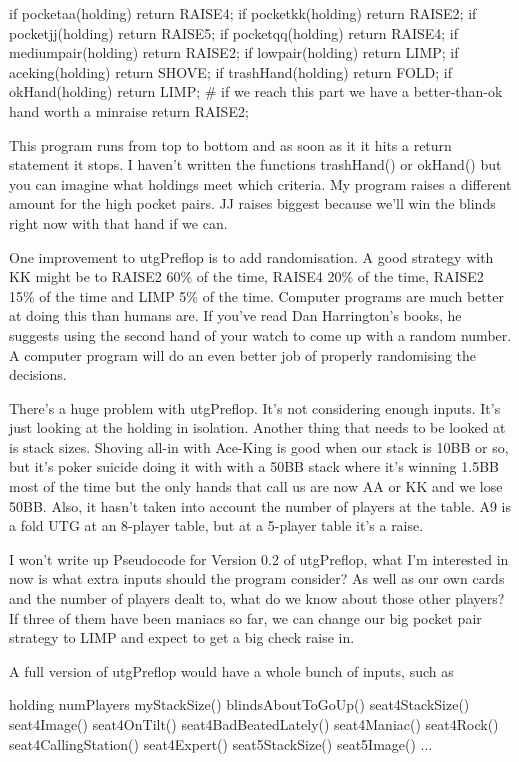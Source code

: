 if pocketaa(holding) return RAISE4;
if pocketkk(holding) return RAISE2;
if pocketjj(holding) return RAISE5;
if pocketqq(holding) return RAISE4;
if mediumpair(holding) return RAISE2;
if lowpair(holding) return LIMP;
if aceking(holding) return SHOVE;
if trashHand(holding) return FOLD;
if okHand(holding) return LIMP;
\# if we reach this part we have a better-than-ok hand worth a minraise
return RAISE2;

This program runs from top to bottom and as soon as it it hits a
return statement it stops. I haven't written the functions
trashHand() or okHand() but you can imagine what holdings
meet which criteria. My program raises a different amount
for the high pocket pairs. JJ raises biggest because we'll win the
blinds right now with that hand if we can.

One improvement to utgPreflop is to add randomisation. A good strategy
with KK might be to RAISE2 60\% of the time, RAISE4 20\% of the time,
RAISE2 15\% of the time and LIMP 5\% of the time. Computer programs
are much better at doing this than humans are. If you've read
Dan Harrington's books, he suggests using the second hand of your
watch to come up with a random number. A computer program will do an
even better job of properly randomising the decisions.

There's a huge problem with utgPreflop. It's not considering enough
inputs. It's just looking at the holding in isolation. Another thing
that needs to be looked at is stack sizes. Shoving all-in with
Ace-King is good when our stack is 10BB or so, but it's poker suicide
doing it with with a 50BB stack where it's winning 1.5BB most of the
time but the only hands that call us are now AA or KK and we lose 50BB.
Also, it hasn't taken into account the number of players at
the table. A9 is a fold UTG at an 8-player table, but at a 5-player
table it's a raise.

I won't write up Pseudocode for Version 0.2 of utgPreflop, what I'm
interested in now is what extra inputs should the program consider?
As well as our own cards and the number of players dealt to, what do
we know about those other players? If three of them have been maniacs
so far, we can change our big pocket pair strategy to LIMP and expect
to get a big check raise in.

A full version of utgPreflop would have a whole bunch of inputs, such
as

holding
numPlayers
myStackSize()
blindsAboutToGoUp()
seat4StackSize()
seat4Image()
seat4OnTilt()
seat4BadBeatedLately()
seat4Maniac()
seat4Rock()
seat4CallingStation()
seat4Expert()
seat5StackSize()
seat5Image()
...

